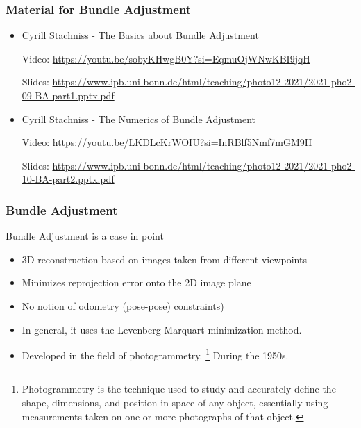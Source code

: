 \begin{frame}
    \frametitle{Material for Bundle Adjustment}
   
   
    \begin{itemize}
    \item Cyrill Stachniss - The Basics about Bundle Adjustment
   
    Video: \url{https://youtu.be/sobyKHwgB0Y?si=EqmuOjWNwKBI9jqH}
   
    Slides: \url{https://www.ipb.uni-bonn.de/html/teaching/photo12-2021/2021-pho2-09-BA-part1.pptx.pdf}
    \item Cyrill Stachniss - The Numerics of Bundle Adjustment
   
    Video: \url{https://youtu.be/LKDLcKrWOIU?si=InRBlf5Nmf7mGM9H}
   
   Slides: \url{https://www.ipb.uni-bonn.de/html/teaching/photo12-2021/2021-pho2-10-BA-part2.pptx.pdf}
   \end{itemize}
   \end{frame}
   
   \begin{frame}
   \frametitle{Bundle Adjustment}
   
   Bundle Adjustment is a case in point
   
   \begin{itemize}
   \item 3D reconstruction based on images taken from different viewpoints
   \item Minimizes reprojection error onto the 2D image plane
   \item No notion of odometry (pose-pose) constraints)
   \item In general, it uses the Levenberg-Marquart minimization method.
   \item Developed in the field of photogrammetry. \footnote{Photogrammetry is the technique used to study and accurately define the shape, dimensions, and position in space of any object, essentially using measurements taken on one or more photographs of that object.} During the 1950s.
   \end{itemize}
   
   \end{frame}
   
